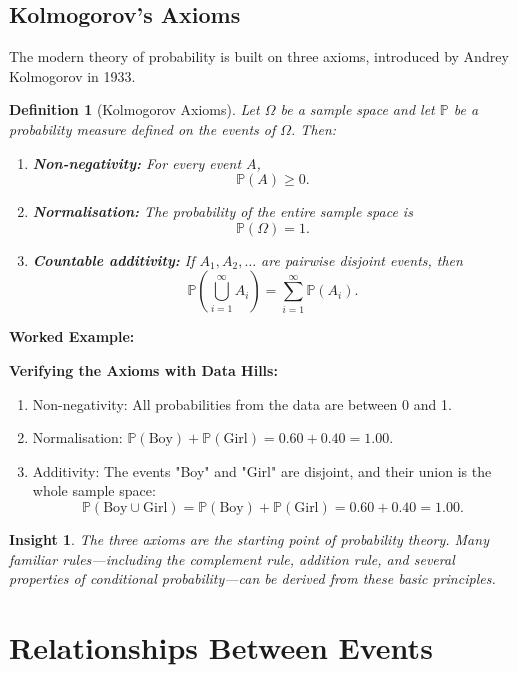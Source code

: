 \documentclass[12pt,a4paper,oneside]{report}
\theoremstyle{mytheorem}
\theoremstyle{mydefinition}
\newtheorem{definition}[theorem]{Definition}
\theoremstyle{myremark}
\newtheorem{insight}[theorem]{Insight}
\newenvironment{worked}{%
  \par\medskip\noindent\textbf{\color{myorange}Worked Example:}\par\smallskip
}{%
  \par\medskip
}
\newcommand{\Prob}{\mathbb{P}}
\begin{document}
\section{Kolmogorov's Axioms}
The modern theory of probability is built on three axioms, introduced by Andrey Kolmogorov in 1933.

\begin{definition}[Kolmogorov Axioms]
Let $\Omega$ be a sample space and let $\Prob$ be a probability measure defined on the events of $\Omega$. Then:
\begin{enumerate}[label=\textbf{A\arabic*.}]
    \item \textbf{Non-negativity:} For every event $A$,
    \[
        \Prob(A) \ge 0.
    \]
    \item \textbf{Normalisation:} The probability of the entire sample space is
    \[
        \Prob(\Omega) = 1.
    \]
    \item \textbf{Countable additivity:} If $A_1, A_2, \ldots$ are pairwise disjoint events, then
    \[
        \Prob\left(\bigcup_{i=1}^{\infty} A_i\right)
        =
        \sum_{i=1}^{\infty} \Prob(A_i).
    \]
\end{enumerate}
\end{definition}

\begin{worked}
\textbf{Verifying the Axioms with Data Hills:}
\begin{enumerate}
    \item Non-negativity: All probabilities from the data are between 0 and 1.
    \item Normalisation: $\Prob(\text{Boy}) + \Prob(\text{Girl}) = 0.60 + 0.40 = 1.00$.
    \item Additivity: The events "Boy" and "Girl" are disjoint, and their union is the whole sample space:
    \[
    \Prob(\text{Boy} \cup \text{Girl}) = \Prob(\text{Boy}) + \Prob(\text{Girl}) = 0.60 + 0.40 = 1.00.
    \]
\end{enumerate}
\end{worked}

\begin{insight}
The three axioms are the starting point of probability theory. Many familiar rules—including the complement rule, addition rule, and several properties of conditional probability—can be derived from these basic principles.
\end{insight}

\chapter{Relationships Between Events}
\end{document}
